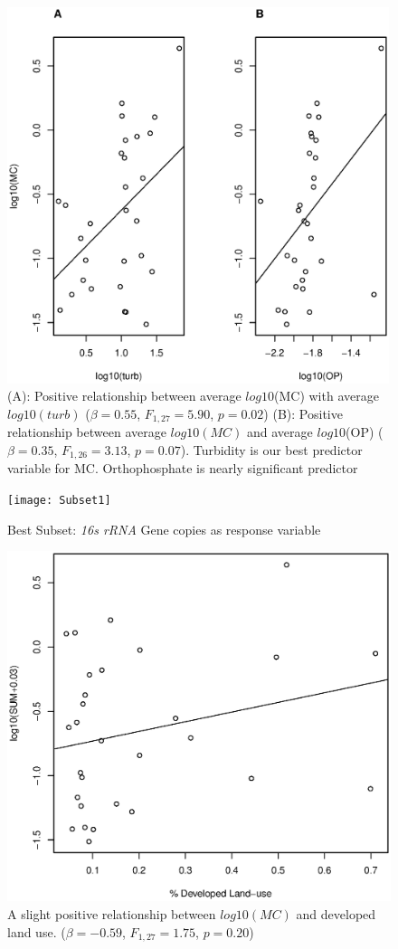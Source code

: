 \begin{figure}
\includegraphics[width=\textwidth, height=11cm]{figures/plot2}
\caption{
(A): Positive relationship between average $log10$(MC) with average $log10(turb)$ ($\beta=0.55$, $F_{{1,27}}=5.90$, $p=0.02$)
(B): Positive relationship between average $log10(MC)$ and average  $log10$(OP) ($\beta=0.35$, $F_{{1,26}}=3.13$, $p=0.07$). 
Turbidity is our best predictor variable for MC. Orthophosphate is nearly significant predictor}
\label{fig:plot2}
\end{figure}

\begin{figure}[!ht]
  \texttt{[image: Subset1]}
  \caption{Best Subset: \emph{16s rRNA} Gene copies as response variable}
  \label{subset2}
\end{figure}




\begin{figure}
\includegraphics[width=\textwidth]{figures/developed}
\caption{A slight positive relationship between $log10(MC)$ and developed land use. ($\beta=-0.59$, $F_{{1,27}}=1.75$, $p=0.20$)}
\label{fig:developed}
\end{figure}

